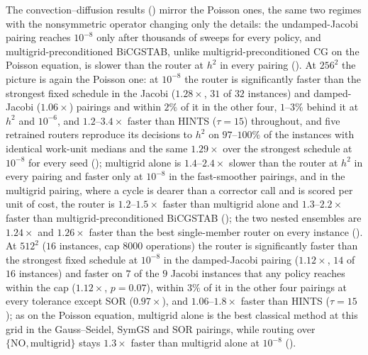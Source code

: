 The convection--diffusion results () mirror the Poisson ones, the same two regimes with the nonsymmetric operator changing only the details: the undamped-Jacobi pairing reaches $10^{-8}$ only after thousands of sweeps for every policy, and multigrid-preconditioned BiCGSTAB, unlike multigrid-preconditioned CG on the Poisson equation, is slower than the router at $h^2$ in every pairing (). At $256^2$ the picture is again the Poisson one: at $10^{-8}$ the router is significantly faster than the strongest fixed schedule in the Jacobi ($1.28\times$, $31$ of $32$ instances) and damped-Jacobi ($1.06\times$) pairings and within $2\%$ of it in the other four, $1$--$3\%$ behind it at $h^2$ and $10^{-6}$, and $1.2$--$3.4\times$ faster than HINTS ($\tau{=}15$) throughout, and five retrained routers reproduce its decisions to $h^2$ on $97$--$100\%$ of the instances with identical work-unit medians and the same $1.29\times$ over the strongest schedule at $10^{-8}$ for every seed (); multigrid alone is $1.4$--$2.4\times$ slower than the router at $h^2$ in every pairing and faster only at $10^{-8}$ in the fast-smoother pairings, and in the multigrid pairing, where a cycle is dearer than a corrector call and is scored per unit of cost, the router is $1.2$--$1.5\times$ faster than multigrid alone and $1.3$--$2.2\times$ faster than multigrid-preconditioned BiCGSTAB (); the two nested ensembles are $1.24\times$ and $1.26\times$ faster than the best single-member router on every instance (). At $512^2$ ($16$ instances, cap $8000$ operations) the router is significantly faster than the strongest fixed schedule at $10^{-8}$ in the damped-Jacobi pairing ($1.12\times$, $14$ of $16$ instances) and faster on $7$ of the $9$ Jacobi instances that any policy reaches within the cap ($1.12\times$, $p = 0.07$), within $3\%$ of it in the other four pairings at every tolerance except SOR ($0.97\times$), and $1.06$--$1.8\times$ faster than HINTS ($\tau{=}15$); as on the Poisson equation, multigrid alone is the best classical method at this grid in the Gauss--Seidel, SymGS and SOR pairings, while routing over $\{\mathrm{NO}, \text{multigrid}\}$ stays $1.3\times$ faster than multigrid alone at $10^{-8}$ ().

\begin{table}[H]
\color{red}
\centering
\caption{Convection--diffusion: median wall-clock time to relative error $\varepsilon \in \{10^{-3}, h^2, 10^{-8}\}$ on the $128^2$, $256^2$ and $512^2$ grids for every pairing and policy, and for the classical baselines without corrector (conventions as in ).}
\resizebox{\textwidth}{!}{\catimeconv}
\label{tab:ca_time_conv}
\end{table}

